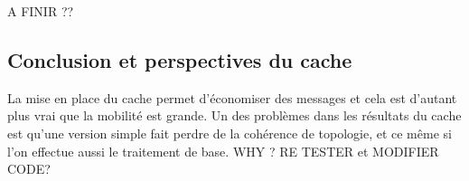 A FINIR ??


\subsection{Conclusion et perspectives du cache} 

La mise en place du cache permet d'économiser des messages et cela est d'autant plus vrai que la mobilité est grande. Un des problèmes dans les résultats du cache est qu'une version simple fait perdre de la cohérence de topologie, et ce même si l'on effectue aussi le traitement de base. WHY ? RE TESTER et MODIFIER CODE?


